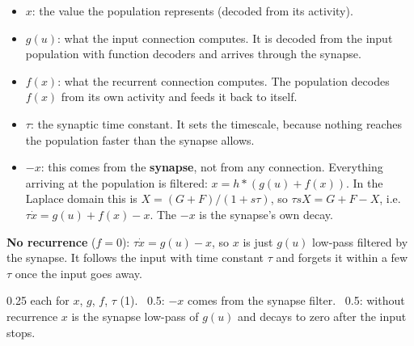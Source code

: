 \documentclass[11pt,letterpaper]{article}
\newcommand{\ans}[1]{\par\vspace{4pt}{\bfseries #1}\quad}
\begin{document}
\ans{(a) [2]}
\begin{itemize}[leftmargin=1.2em]
\item $x$: the value the population represents (decoded from its activity).
\item $g(u)$: what the input connection computes. It is decoded from the input population with function decoders and arrives through the synapse.
\item $f(x)$: what the recurrent connection computes. The population decodes $f(x)$ from its own activity and feeds it back to itself.
\item $\tau$: the synaptic time constant. It sets the timescale, because nothing reaches the population faster than the synapse allows.
\item $-x$: this comes from the \textbf{synapse}, not from any connection. Everything arriving at the population is filtered: $x = h * (g(u) + f(x))$. In the Laplace domain this is $X = (G + F)/(1 + s\tau)$, so $\tau sX = G + F - X$, i.e.\ $\tau\dot x = g(u) + f(x) - x$. The $-x$ is the synapse's own decay.
\end{itemize}
\textbf{No recurrence} ($f = 0$): $\tau\dot x = g(u) - x$, so $x$ is just $g(u)$ low-pass filtered by the synapse. It follows the input with time constant $\tau$ and forgets it within a few $\tau$ once the input goes away.
\begin{marking}
0.25 each for $x$, $g$, $f$, $\tau$ (1). \ 0.5: $-x$ comes from the synapse filter. \ 0.5: without recurrence $x$ is the synapse low-pass of $g(u)$ and decays to zero after the input stops.
\end{marking}
\end{document}

